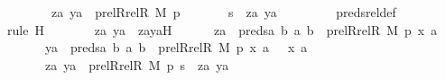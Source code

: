 \begin{isabellebody}
\ \ \ \ \ \ {\isasymand}\ {\isasymlangle}za{\isacharcomma}{\kern0pt}\ ya{\isasymrangle}\ {\isasymin}\ prel{\isacharparenleft}{\kern0pt}Rrel{\isacharparenleft}{\kern0pt}R{\isacharcomma}{\kern0pt}\ M{\isacharparenright}{\kern0pt}{\isacharcomma}{\kern0pt}\ p{\isacharparenright}{\kern0pt}\isanewline
\ \ \ \ \ \ {\isasymand}\ s\ {\isacharequal}{\kern0pt}\ {\isacharless}{\kern0pt}za{\isacharcomma}{\kern0pt}\ ya{\isachargreater}{\kern0pt}{\isachardoublequoteclose}\ \isanewline
\ \ \ \ \ \ \isamarkupfalse%
\ preds{\isacharunderscore}{\kern0pt}rel{\isacharunderscore}{\kern0pt}def\ \isanewline
\ \ \ \ \ \ \isamarkupfalse%
{\isacharparenleft}{\kern0pt}rule\ H{\isacharparenright}{\kern0pt}\isanewline
\ \ \ \ \isamarkupfalse%
\ \isamarkupfalse%
\ za\ ya\ \ zayaH{\isacharcolon}{\kern0pt}\isanewline
\ \ \ \ \ \ {\isachardoublequoteopen}za\ {\isasymin}\ preds{\isacharparenleft}{\kern0pt}{\isasymlambda}a\ b{\isachardot}{\kern0pt}\ {\isasymlangle}a{\isacharcomma}{\kern0pt}\ b{\isasymrangle}\ {\isasymin}\ prel{\isacharparenleft}{\kern0pt}Rrel{\isacharparenleft}{\kern0pt}R{\isacharcomma}{\kern0pt}\ M{\isacharparenright}{\kern0pt}{\isacharcomma}{\kern0pt}\ p{\isacharparenright}{\kern0pt}{\isacharcomma}{\kern0pt}\ {\isasymlangle}x{\isacharcomma}{\kern0pt}\ a{\isasymrangle}{\isacharparenright}{\kern0pt}{\isachardoublequoteclose}\ \isanewline
\ \ \ \ \ \ {\isachardoublequoteopen}ya\ {\isasymin}\ preds{\isacharparenleft}{\kern0pt}{\isasymlambda}a\ b{\isachardot}{\kern0pt}\ {\isasymlangle}a{\isacharcomma}{\kern0pt}\ b{\isasymrangle}\ {\isasymin}\ prel{\isacharparenleft}{\kern0pt}Rrel{\isacharparenleft}{\kern0pt}R{\isacharcomma}{\kern0pt}\ M{\isacharparenright}{\kern0pt}{\isacharcomma}{\kern0pt}\ p{\isacharparenright}{\kern0pt}{\isacharcomma}{\kern0pt}\ {\isasymlangle}x{\isacharcomma}{\kern0pt}\ a{\isasymrangle}{\isacharparenright}{\kern0pt}\ {\isasymunion}\ {\isacharbraceleft}{\kern0pt}\ {\isacharless}{\kern0pt}x{\isacharcomma}{\kern0pt}\ a{\isachargreater}{\kern0pt}\ {\isacharbraceright}{\kern0pt}{\isachardoublequoteclose}\ \isanewline
\ \ \ \ \ \ {\isachardoublequoteopen}{\isasymlangle}za{\isacharcomma}{\kern0pt}\ ya{\isasymrangle}\ {\isasymin}\ prel{\isacharparenleft}{\kern0pt}Rrel{\isacharparenleft}{\kern0pt}R{\isacharcomma}{\kern0pt}\ M{\isacharparenright}{\kern0pt}{\isacharcomma}{\kern0pt}\ p{\isacharparenright}{\kern0pt}{\isachardoublequoteclose}\ {\isachardoublequoteopen}s\ {\isacharequal}{\kern0pt}\ {\isacharless}{\kern0pt}za{\isacharcomma}{\kern0pt}\ ya{\isachargreater}{\kern0pt}{\isachardoublequoteclose}\ \isamarkupfalse%

\end{isabellebody}
